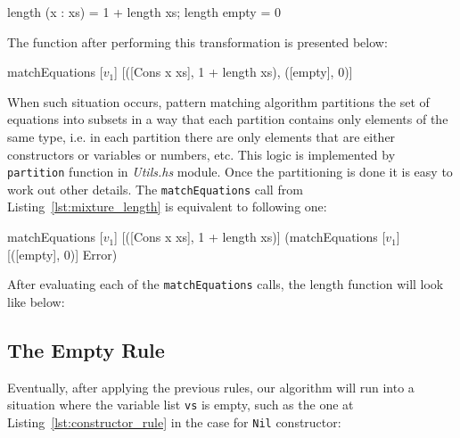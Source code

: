 \documentclass[12pt,a4paper]{report}
\begin{document}
\vspace*{0.2in}
\begin{code}[style=haskell]
  length (x : xs) = 1 + length xs;
  length empty = 0
\end{code}

The function after performing this transformation is presented below:

\vspace*{0.2in}
\begin{code}[style=haskell,label=lst:mixture_length, mathescape=true,
  caption={Mixture rule application.}]
  matchEquations [$v_{1}$]
                 [([Cons x xs], 1 + length xs),
                  ([empty], 0)]
\end{code}

When such situation occurs, pattern matching algorithm partitions the set of
equations into subsets in a way that each partition contains only elements of
the same type, i.e. in each partition there are only elements that are either
constructors or variables or numbers, etc. This logic is implemented by
\texttt{partition} function in \textit{Utils.hs} module. Once the partitioning
is done it is easy to work out other details. The \texttt{matchEquations} call
from Listing~\ref{lst:mixture_length} is equivalent to following one:

\vspace*{0.2in}
\begin{code}[style=haskell,mathescape=true]
  matchEquations [$v_{1}$]
                 [([Cons x xs], 1 + length xs)]
                 (matchEquations [$v_{1}$]
                                 [([empty], 0)]
                                 Error)
\end{code}

After evaluating each of the \texttt{matchEquations} calls, the length function
will look like below:

\vspace*{0.2in}

\subsection{The Empty Rule}
Eventually, after applying the previous rules, our algorithm will run into a
situation where the variable list \texttt{vs} is empty, such as the one at
Listing~\ref{lst:constructor_rule} in the case for \texttt{Nil} constructor:
\end{document}
